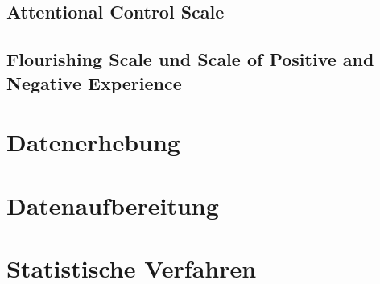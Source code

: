 \subsection{Attentional Control Scale}\label{subsection.acs}
\subsection{Flourishing Scale und Scale of Positive and Negative Experience}\label{subsection.flourishingScale}

\section{Datenerhebung}\label{section.datenerhebung}

\section{Datenaufbereitung}\label{section.datenaufbereitung}

\section{Statistische Verfahren}\label{section.statistischeVerfahren}





